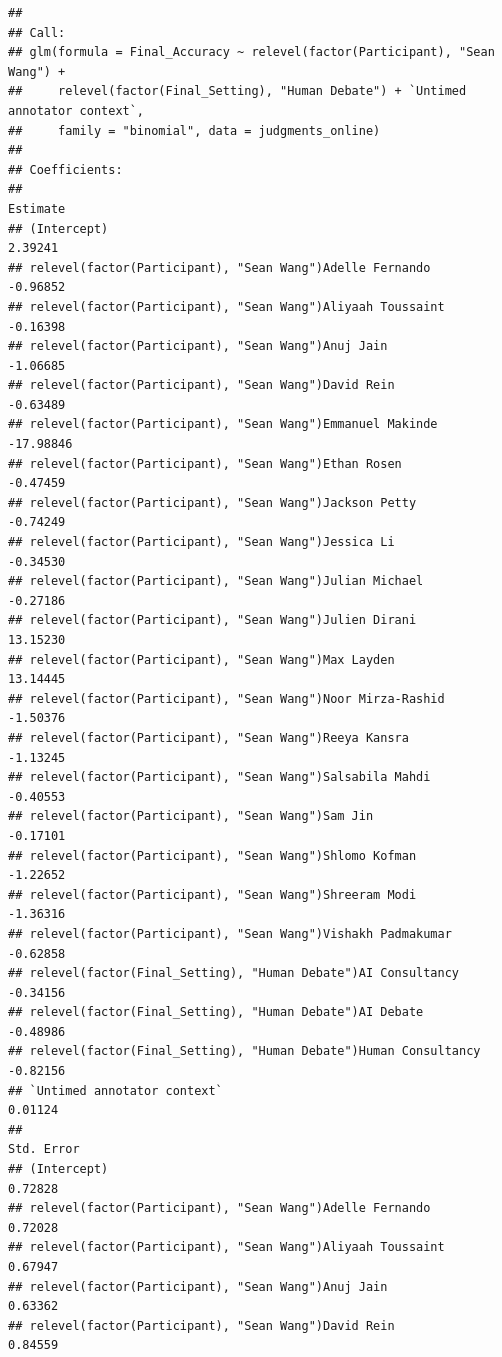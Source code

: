 \documentclass[
]{article}
\begin{document}
\begin{verbatim}
## 
## Call:
## glm(formula = Final_Accuracy ~ relevel(factor(Participant), "Sean Wang") + 
##     relevel(factor(Final_Setting), "Human Debate") + `Untimed annotator context`, 
##     family = "binomial", data = judgments_online)
## 
## Coefficients:
##                                                                   Estimate
## (Intercept)                                                        2.39241
## relevel(factor(Participant), "Sean Wang")Adelle Fernando          -0.96852
## relevel(factor(Participant), "Sean Wang")Aliyaah Toussaint        -0.16398
## relevel(factor(Participant), "Sean Wang")Anuj Jain                -1.06685
## relevel(factor(Participant), "Sean Wang")David Rein               -0.63489
## relevel(factor(Participant), "Sean Wang")Emmanuel Makinde        -17.98846
## relevel(factor(Participant), "Sean Wang")Ethan Rosen              -0.47459
## relevel(factor(Participant), "Sean Wang")Jackson Petty            -0.74249
## relevel(factor(Participant), "Sean Wang")Jessica Li               -0.34530
## relevel(factor(Participant), "Sean Wang")Julian Michael           -0.27186
## relevel(factor(Participant), "Sean Wang")Julien Dirani            13.15230
## relevel(factor(Participant), "Sean Wang")Max Layden               13.14445
## relevel(factor(Participant), "Sean Wang")Noor Mirza-Rashid        -1.50376
## relevel(factor(Participant), "Sean Wang")Reeya Kansra             -1.13245
## relevel(factor(Participant), "Sean Wang")Salsabila Mahdi          -0.40553
## relevel(factor(Participant), "Sean Wang")Sam Jin                  -0.17101
## relevel(factor(Participant), "Sean Wang")Shlomo Kofman            -1.22652
## relevel(factor(Participant), "Sean Wang")Shreeram Modi            -1.36316
## relevel(factor(Participant), "Sean Wang")Vishakh Padmakumar       -0.62858
## relevel(factor(Final_Setting), "Human Debate")AI Consultancy      -0.34156
## relevel(factor(Final_Setting), "Human Debate")AI Debate           -0.48986
## relevel(factor(Final_Setting), "Human Debate")Human Consultancy   -0.82156
## `Untimed annotator context`                                        0.01124
##                                                                 Std. Error
## (Intercept)                                                        0.72828
## relevel(factor(Participant), "Sean Wang")Adelle Fernando           0.72028
## relevel(factor(Participant), "Sean Wang")Aliyaah Toussaint         0.67947
## relevel(factor(Participant), "Sean Wang")Anuj Jain                 0.63362
## relevel(factor(Participant), "Sean Wang")David Rein                0.84559

\end{verbatim}
\end{document}
